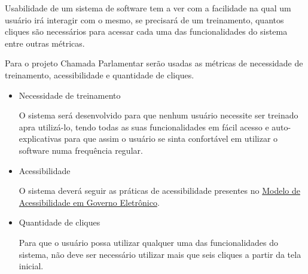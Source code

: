 Usabilidade de um sistema de software tem a ver com a facilidade na qual um usuário irá interagir com o mesmo, se precisará de um treinamento, quantos cliques são necessários para acessar cada uma das funcionalidades do sistema entre outras métricas.

Para o projeto Chamada Parlamentar serão usadas as métricas de necessidade de treinamento, acessibilidade e quantidade de cliques.

\begin{itemize}

	\item{Necessidade de treinamento}

		O sistema será desenvolvido para que nenhum usuário necessite ser treinado apra utilizá-lo, tendo todas as suas funcionalidades em fácil acesso e auto-explicativas para que assim o usuário se sinta confortável em utilizar o software numa frequência regular.

	\item{Acessibilidade}

		O sistema deverá seguir as práticas de acessibilidade presentes no \href{http://www.governoeletronico.gov.br/acoes-e-projetos/e-MAG}{Modelo de Acessibilidade em Governo Eletrônico}.

	\item{Quantidade de cliques}

		Para que o usuário possa utilizar qualquer uma das funcionalidades do sistema, não deve ser necessário utilizar mais que seis cliques a partir da tela inicial.

\end{itemize}